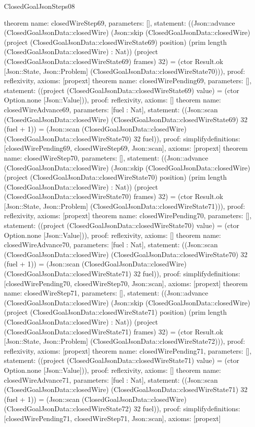 \begin{lexlean}{ClosedGoalJsonSteps08}
\begin{semanticmodule}
{}
theorem{
 name: closedWireStep69, parameters: [],
 statement: ((Json::advance (ClosedGoalJsonData::closedWire) (Json::skip (ClosedGoalJsonData::closedWire) (project (ClosedGoalJsonData::closedWireState69) position) (prim length (ClosedGoalJsonData::closedWire) : Nat)) (project (ClosedGoalJsonData::closedWireState69) frames) 32) = (ctor Result.ok [Json::State, Json::Problem] (ClosedGoalJsonData::closedWireState70))), proof: reflexivity{}, axioms: [propext]
}
theorem{
 name: closedWirePending69, parameters: [],
 statement: ((project (ClosedGoalJsonData::closedWireState69) value) = (ctor Option.none [Json::Value])), proof: reflexivity{}, axioms: []
}
theorem{
 name: closedWireAdvance69, parameters: [fuel : Nat],
 statement: ((Json::scan (ClosedGoalJsonData::closedWire) (ClosedGoalJsonData::closedWireState69) 32 (fuel + 1)) = (Json::scan (ClosedGoalJsonData::closedWire) (ClosedGoalJsonData::closedWireState70) 32 fuel)), proof: simplify{definitions: [closedWirePending69, closedWireStep69, Json::scan]}, axioms: [propext]
}
theorem{
 name: closedWireStep70, parameters: [],
 statement: ((Json::advance (ClosedGoalJsonData::closedWire) (Json::skip (ClosedGoalJsonData::closedWire) (project (ClosedGoalJsonData::closedWireState70) position) (prim length (ClosedGoalJsonData::closedWire) : Nat)) (project (ClosedGoalJsonData::closedWireState70) frames) 32) = (ctor Result.ok [Json::State, Json::Problem] (ClosedGoalJsonData::closedWireState71))), proof: reflexivity{}, axioms: [propext]
}
theorem{
 name: closedWirePending70, parameters: [],
 statement: ((project (ClosedGoalJsonData::closedWireState70) value) = (ctor Option.none [Json::Value])), proof: reflexivity{}, axioms: []
}
theorem{
 name: closedWireAdvance70, parameters: [fuel : Nat],
 statement: ((Json::scan (ClosedGoalJsonData::closedWire) (ClosedGoalJsonData::closedWireState70) 32 (fuel + 1)) = (Json::scan (ClosedGoalJsonData::closedWire) (ClosedGoalJsonData::closedWireState71) 32 fuel)), proof: simplify{definitions: [closedWirePending70, closedWireStep70, Json::scan]}, axioms: [propext]
}
theorem{
 name: closedWireStep71, parameters: [],
 statement: ((Json::advance (ClosedGoalJsonData::closedWire) (Json::skip (ClosedGoalJsonData::closedWire) (project (ClosedGoalJsonData::closedWireState71) position) (prim length (ClosedGoalJsonData::closedWire) : Nat)) (project (ClosedGoalJsonData::closedWireState71) frames) 32) = (ctor Result.ok [Json::State, Json::Problem] (ClosedGoalJsonData::closedWireState72))), proof: reflexivity{}, axioms: [propext]
}
theorem{
 name: closedWirePending71, parameters: [],
 statement: ((project (ClosedGoalJsonData::closedWireState71) value) = (ctor Option.none [Json::Value])), proof: reflexivity{}, axioms: []
}
theorem{
 name: closedWireAdvance71, parameters: [fuel : Nat],
 statement: ((Json::scan (ClosedGoalJsonData::closedWire) (ClosedGoalJsonData::closedWireState71) 32 (fuel + 1)) = (Json::scan (ClosedGoalJsonData::closedWire) (ClosedGoalJsonData::closedWireState72) 32 fuel)), proof: simplify{definitions: [closedWirePending71, closedWireStep71, Json::scan]}, axioms: [propext]
}
\end{semanticmodule}
\end{lexlean}
